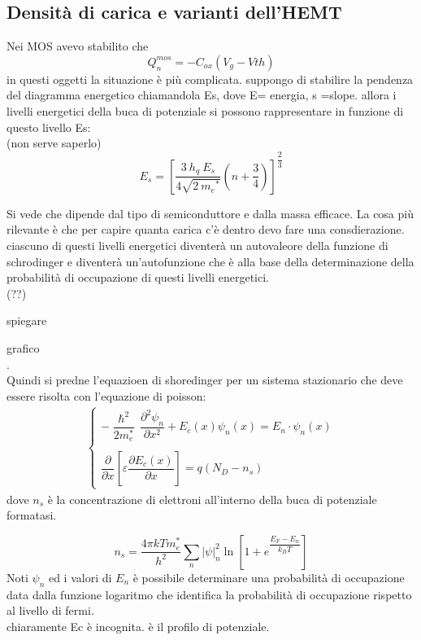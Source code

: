 \subsection{Densità di carica e varianti dell'HEMT}
Nei MOS avevo stabilito che
\begin{equation}
    Q_n^{mos}=-C_{ox}(V_g-V{th})
\end{equation}
in questi oggetti la situazione è più complicata.
suppongo di stabilire la pendenza del diagramma energetico chiamandola Es, dove E= energia, s =slope. allora i livelli energetici della buca di potenziale si possono rappresentare in funzione di questo livello Es:\\
(non serve saperlo)
\begin{equation}
    E_s = \left[\dfrac{3\ h_q\ E_s}{4\sqrt{2\ {m_e}^*}}\left( n+\dfrac{3}{4}\right)\right]^{\dfrac{2}{3}}
\end{equation}

Si vede che dipende dal tipo di semiconduttore e dalla massa efficace. 
La cosa più rilevante è che per capire quanta carica c'è dentro devo fare una consdierazione. ciascuno di questi livelli energetici diventerà un autovaleore della funzione di schrodinger e diventerà un'autofunzione che è alla base della determinazione della probabilità di occupazione di questi livelli energetici.\\(??)
\begin{ricevimento}
    spiegare
\end{ricevimento}

grafico\\
.\\
Quindi si predne l'equazioen di shoredinger per un sistema stazionario che deve essere risolta con l'equazione di poisson:
\begin{align}
    \begin{cases}
        -\dfrac{\hslash^2}{2m_e^*} \, \dfrac{\partial^2 \psi_n}{\partial x^{2}}+E_c(x)\psi_n(x)=E_n \cdot \psi_n(x) \\
        \\
        \dfrac{\partial}{\partial x}\left[ \varepsilon \dfrac{\partial E_c(x)}{\partial x}\right]=q(N_D-n_s)
    \end{cases}
\end{align}
dove $n_s$ è la concentrazione di elettroni all'interno della buca di potenziale formatasi.

\begin{equation}
    n_s=\dfrac{4\pi kTm_e^*}{h^2}\sum_n \left| \psi \right|_n^2 \ln{\left[ 1+e^{\dfrac{E_F-E_n}{k_BT}}\right]}
\end{equation}
Noti $\psi_n$ ed i valori di $E_n$ è possibile determinare una probabilità di occupazione data dalla funzione logaritmo che identifica la probabilità di occupazione rispetto al livello di fermi.\\
chiaramente Ec è incognita. è il profilo di potenziale.

